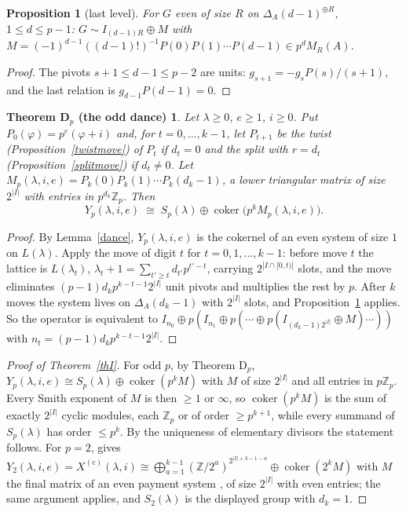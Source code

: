 \documentclass[10pt]{article}
\theoremstyle{ds}
\newtheorem{proposition}[lemma]{Proposition}
\newtheorem*{thmDp}{Theorem D$_p$ (the odd dance)}
\theoremstyle{dsrem}
\newcommand{\Z}{\mathbb{Z}}
\newcommand{\coker}{\operatorname{coker}}
\begin{document}
\begin{proposition}[last level]\label{lastlevel}
For $G$ even of size $R$ on $\Delta_A(d-1)^{\oplus R}$, $1\le d\le p-1$: $G\sim I_{(d-1)R}\oplus M$ with $M=(-1)^{d-1}((d-1)!)^{-1}P(0)P(1)\cdots P(d-1)\in p^dM_R(A)$.
\end{proposition}

\begin{proof}
The pivots $s+1\le d-1\le p-2$ are units: $g_{s+1}=-g_sP(s)/(s+1)$, and the last relation is $g_{d-1}P(d-1)=0$.
\end{proof}

\begin{thmDp}
Let $\lambda\ge0$, $e\ge1$, $i\ge0$. Put $P_0(\varphi)=p^e(\varphi+i)$ and, for $t=0,\dots,k-1$, let $P_{t+1}$ be the twist (Proposition~\ref{twistmove}) of $P_t$ if $d_t=0$ and the split with $r=d_t$ (Proposition~\ref{splitmove}) if $d_t\ne0$. Let $M_p(\lambda,i,e)=P_k(0)P_k(1)\cdots P_k(d_k-1)$, a lower triangular matrix of size $2^{|I|}$ with entries in $p^{d_k}\Z_p$. Then
\[
Y_p(\lambda,i,e)\;\cong\;S_p(\lambda)\oplus\coker\big(p^kM_p(\lambda,i,e)\big).
\]
\end{thmDp}

\begin{proof}
By Lemma~\ref{dance}, $Y_p(\lambda,i,e)$ is the cokernel of an even system of size $1$ on $L(\lambda)$. Apply the move of digit $t$ for $t=0,1,\dots,k-1$: before move $t$ the lattice is $L(\lambda_t)$, $\lambda_t+1=\sum_{t'\ge t}d_{t'}p^{t'-t}$, carrying $2^{|I\cap[0,t)|}$ slots, and the move eliminates $(p-1)d_kp^{k-t-1}2^{|I|}$ unit pivots and multiplies the rest by $p$. After $k$ moves the system lives on $\Delta_A(d_k-1)$ with $2^{|I|}$ slots, and Proposition~\ref{lastlevel} applies. So the operator is equivalent to $I_{n_0}\oplus p(I_{n_1}\oplus p(\cdots\oplus p(I_{(d_k-1)2^{|I|}}\oplus M)\cdots))$ with $n_t=(p-1)d_kp^{k-t-1}2^{|I|}$.
\end{proof}

\begin{proof}[Proof of Theorem~\ref{thI}]
For odd $p$, by Theorem D$_p$, $Y_p(\lambda,i,e)\cong S_p(\lambda)\oplus\coker(p^kM)$ with $M$ of size $2^{|I|}$ and all entries in $p\Z_p$. Every Smith exponent of $M$ is then $\ge1$ or $\infty$, so $\coker(p^kM)$ is the sum of exactly $2^{|I|}$ cyclic modules, each $\Z_p$ or of order $\ge p^{k+1}$, while every summand of $S_p(\lambda)$ has order $\le p^k$. By the uniqueness of elementary divisors the statement follows. For $p=2$, \cite[Theorem~D]{DST} gives $Y_2(\lambda,i,e)=X^{(e)}(\lambda,i)\cong\bigoplus_{a=1}^{k-1}(\Z/2^a)^{2^{|I|+k-1-a}}\oplus\coker(2^kM)$ with $M$ the final matrix of an even payment system \cite[Proposition~4.3]{DST}, of size $2^{|I|}$ with even entries; the same argument applies, and $S_2(\lambda)$ is the displayed group with $d_k=1$.
\end{proof}
\end{document}
